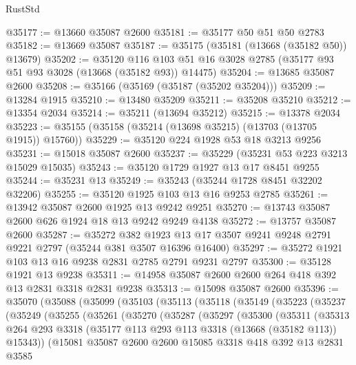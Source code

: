 \begin{lexlean}{RustStd}
\begin{coremodule}
@35177 := @13660 @35087 @2600
@35181 := @35177 @50 @51 @50 @2783
@35182 := @13669 @35087
@35187 := @35175 (@35181 (@13668 (@35182 @50)) @13679)
@35202 := @35120
    @116
    @103
    @51
    @16
    @3028
    @2785
    (@35177 @93 @51 @93 @3028 (@13668 (@35182 @93)) @14475)
@35204 := @13685 @35087 @2600
@35208 := @35166 (@35169 (@35187 (@35202 @35204)))
@35209 := @13284 @1915
@35210 := @13480 @35209
@35211 := @35208 @35210
@35212 := @13354 @2034
@35214 := @35211 (@13694 @35212)
@35215 := @13378 @2034
@35223 := @35155 (@35158 (@35214 (@13698 @35215) (@13703 (@13705 @1915)) @15760))
@35229 := @35120 @224 @1928 @53 @18 @3213 @9256
@35231 := @15018 @35087 @2600
@35237 := @35229 (@35231 @53 @223 @3213 @15029 @15035)
@35243 := @35120 @1729 @1927 @13 @17 @8451 @9255
@35244 := @35231 @13
@35249 := @35243 (@35244 @1728 @8451 @32202 @32206)
@35255 := @35120 @1925 @103 @13 @16 @9253 @2785
@35261 := @13942 @35087 @2600 @1925 @13 @9242 @9251
@35270 := @13743 @35087 @2600 @626 @1924 @18 @13 @9242 @9249 @4138
@35272 := @13757 @35087 @2600
@35287 := @35272
    @382
    @1923
    @13
    @17
    @3507
    @9241
    @9248
    @2791
    @9221
    @2797
    (@35244 @381 @3507 @16396 @16400)
@35297 := @35272 @1921 @103 @13 @16 @9238 @2831 @2785 @2791 @9231 @2797
@35300 := @35128 @1921 @13 @9238
@35311 := @14958 @35087 @2600 @2600 @264 @418 @392 @13 @2831 @3318 @2831 @9238
@35313 := @15098 @35087 @2600
@35396 := @35070
    (@35088
      (@35099
        (@35103
          (@35113
            (@35118
              (@35149
                (@35223
                  (@35237
                    (@35249
                      (@35255
                        (@35261
                          (@35270
                            (@35287
                              (@35297
                                (@35300
                                  (@35311
                                    (@35313
                                      @264
                                      @293
                                      @3318
                                      (@35177 @113 @293 @113 @3318 (@13668 (@35182 @113)) @15343))
                                    (@15081
                                      @35087
                                      @2600
                                      @2600
                                      @15085
                                      @3318
                                      @418
                                      @392
                                      @13
                                      @2831
                                      @3585

\end{coremodule}
\end{lexlean}
